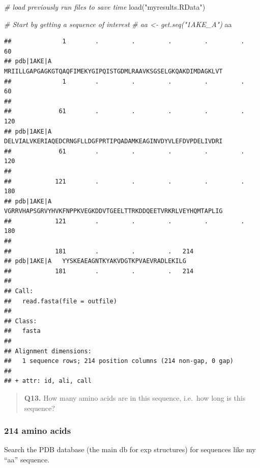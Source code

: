 \documentclass[
]{article}
\newenvironment{Shaded}{\begin{snugshade}}{\end{snugshade}}
\newcommand{\CommentTok}[1]{\textcolor[rgb]{0.56,0.35,0.01}{\textit{#1}}}
\newcommand{\FunctionTok}[1]{\textcolor[rgb]{0.00,0.00,0.00}{#1}}
\newcommand{\NormalTok}[1]{#1}
\newcommand{\StringTok}[1]{\textcolor[rgb]{0.31,0.60,0.02}{#1}}
\begin{document}
\begin{Shaded}
\begin{Highlighting}[]
\CommentTok{\# load previously run files to save time}
\FunctionTok{load}\NormalTok{(}\StringTok{"myresults.RData"}\NormalTok{)}
\end{Highlighting}
\end{Shaded}

\begin{Shaded}
\begin{Highlighting}[]
\CommentTok{\# Start by getting a sequence of interest}
\CommentTok{\# aa \textless{}{-} get.seq("1AKE\_A")}
\NormalTok{aa}
\end{Highlighting}
\end{Shaded}

\begin{verbatim}
##              1        .         .         .         .         .         60 
## pdb|1AKE|A   MRIILLGAPGAGKGTQAQFIMEKYGIPQISTGDMLRAAVKSGSELGKQAKDIMDAGKLVT
##              1        .         .         .         .         .         60 
## 
##             61        .         .         .         .         .         120 
## pdb|1AKE|A   DELVIALVKERIAQEDCRNGFLLDGFPRTIPQADAMKEAGINVDYVLEFDVPDELIVDRI
##             61        .         .         .         .         .         120 
## 
##            121        .         .         .         .         .         180 
## pdb|1AKE|A   VGRRVHAPSGRVYHVKFNPPKVEGKDDVTGEELTTRKDDQEETVRKRLVEYHQMTAPLIG
##            121        .         .         .         .         .         180 
## 
##            181        .         .         .   214 
## pdb|1AKE|A   YYSKEAEAGNTKYAKVDGTKPVAEVRADLEKILG
##            181        .         .         .   214 
## 
## Call:
##   read.fasta(file = outfile)
## 
## Class:
##   fasta
## 
## Alignment dimensions:
##   1 sequence rows; 214 position columns (214 non-gap, 0 gap) 
## 
## + attr: id, ali, call
\end{verbatim}

\begin{quote}
\textbf{Q13.} How many amino acids are in this sequence, i.e.~how long
is this sequence?
\end{quote}

\hypertarget{amino-acids}{%
\subsubsection{214 amino acids}\label{amino-acids}}

Search the PDB database (the main db for exp structures) for sequences
like my ``aa'' sequence.
\end{document}
